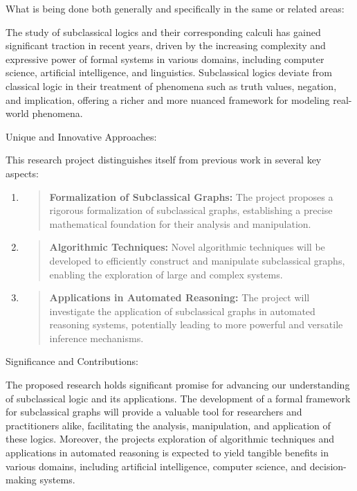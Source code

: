What is being done both generally and specifically in the same or
related areas:

The study of subclassical logics and their corresponding calculi has
gained significant traction in recent years, driven by the increasing
complexity and expressive power of formal systems in various domains,
including computer science, artificial intelligence, and linguistics.
Subclassical logics deviate from classical logic in their treatment of
phenomena such as truth values, negation, and implication, offering a
richer and more nuanced framework for modeling real-world phenomena.

Unique and Innovative Approaches:

This research project distinguishes itself from previous work in several
key aspects:

\begin{enumerate}
\def\labelenumi{\arabic{enumi}.}
\item
  \begin{quote}
  \textbf{Formalization of Subclassical Graphs:} The project proposes a
  rigorous formalization of subclassical graphs, establishing a precise
  mathematical foundation for their analysis and manipulation.
  \end{quote}
\item
  \begin{quote}
  \textbf{Algorithmic Techniques:} Novel algorithmic techniques will be
  developed to efficiently construct and manipulate subclassical graphs,
  enabling the exploration of large and complex systems.
  \end{quote}
\item
  \begin{quote}
  \textbf{Applications in Automated Reasoning:} The project will
  investigate the application of subclassical graphs in automated
  reasoning systems, potentially leading to more powerful and versatile
  inference mechanisms.
  \end{quote}
\end{enumerate}

Significance and Contributions:

The proposed research holds significant promise for advancing our
understanding of subclassical logic and its applications. The
development of a formal framework for subclassical graphs will provide a
valuable tool for researchers and practitioners alike, facilitating the
analysis, manipulation, and application of these logics. Moreover, the
project\textquotesingle s exploration of algorithmic techniques and
applications in automated reasoning is expected to yield tangible
benefits in various domains, including artificial intelligence, computer
science, and decision-making systems.

